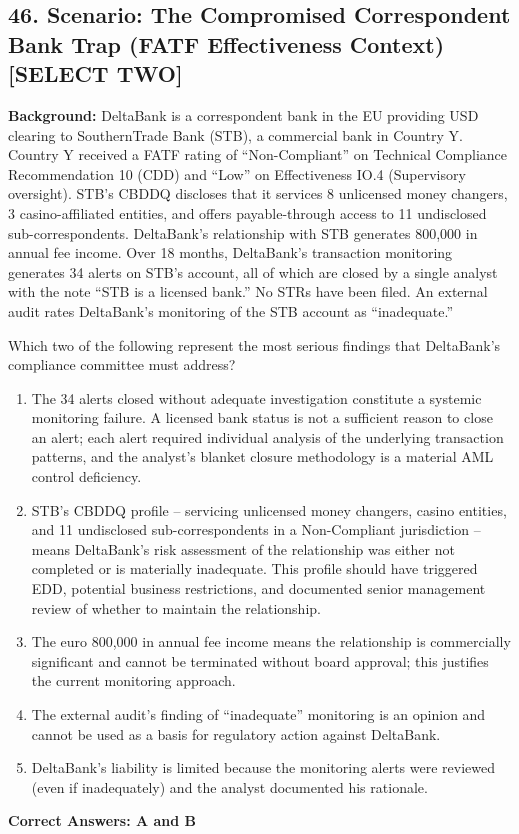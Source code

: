 \documentclass[11pt,a4paper]{article}
\begin{document}
	\subsection{46. Scenario: The Compromised Correspondent Bank Trap (FATF Effectiveness Context) \textnormal{[SELECT TWO]}}
	
	\textbf{Background:} DeltaBank is a correspondent bank in the EU providing USD clearing to SouthernTrade Bank (STB), a commercial bank in Country Y. Country Y received a FATF rating of ``Non-Compliant'' on Technical Compliance Recommendation 10 (CDD) and ``Low'' on Effectiveness IO.4 (Supervisory oversight). STB's CBDDQ discloses that it services 8 unlicensed money changers, 3 casino-affiliated entities, and offers payable-through access to 11 undisclosed sub-correspondents. DeltaBank's relationship with STB generates   800,000 in annual fee income. Over 18 months, DeltaBank's transaction monitoring generates 34 alerts on STB's account, all of which are closed by a single analyst with the note ``STB is a licensed bank.'' No STRs have been filed. An external audit rates DeltaBank's monitoring of the STB account as ``inadequate.''
	
	Which two of the following represent the most serious findings that DeltaBank's compliance committee must address?
	
	\begin{enumerate}[label=\Alph*.]
		\item The 34 alerts closed without adequate investigation constitute a systemic monitoring failure. A licensed bank status is not a sufficient reason to close an alert; each alert required individual analysis of the underlying transaction patterns, and the analyst's blanket closure methodology is a material AML control deficiency.
		\item STB's CBDDQ profile -- servicing unlicensed money changers, casino entities, and 11 undisclosed sub-correspondents in a Non-Compliant jurisdiction -- means DeltaBank's risk assessment of the relationship was either not completed or is materially inadequate. This profile should have triggered EDD, potential business restrictions, and documented senior management review of whether to maintain the relationship.
		\item The euro 800,000 in annual fee income means the relationship is commercially significant and cannot be terminated without board approval; this justifies the current monitoring approach.
		\item The external audit's finding of ``inadequate'' monitoring is an opinion and cannot be used as a basis for regulatory action against DeltaBank.
		\item DeltaBank's liability is limited because the monitoring alerts were reviewed (even if inadequately) and the analyst documented his rationale.
	\end{enumerate}
	\textbf{Correct Answers: A and B}
	
\end{document}
